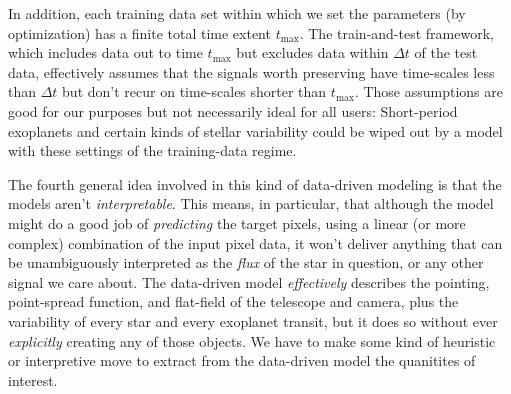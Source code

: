 \documentclass[12pt, preprint]{aastex}
\begin{document}

In addition, each training data set within which we set the parameters (by optimization) has a finite total time extent $t_{\max}$.
The train-and-test framework, which includes data out to time $t_{\max}$ but excludes data within $\Delta t$ of the test data,
  effectively assumes that the signals worth preserving have time-scales less than $\Delta t$ but don't recur on time-scales
  shorter than $t_{\max}$.
Those assumptions are good for our purposes but not necessarily ideal for all users:
Short-period exoplanets and certain kinds of stellar variability
  could be wiped out by a model with these settings of the training-data regime.

The fourth general idea involved in this kind of data-driven modeling is that the models aren't \emph{interpretable}.
This means, in particular, that although the model might do a good job of \emph{predicting} the target pixels,
  using a linear (or more complex) combination of the input pixel data,
  it won't deliver anything that can be unambiguously interpreted as the \emph{flux} of the star in question,
  or any other signal we care about.
The data-driven model \emph{effectively} describes the pointing, point-spread function, and flat-field
  of the telescope and camera,
  plus the variability of every star and every exoplanet transit,
  but it does so without ever \emph{explicitly} creating any of those objects.
We have to make some kind of heuristic or interpretive move to extract from the data-driven model the quanitites of interest.
\end{document}
